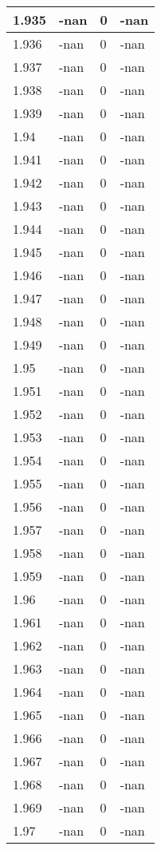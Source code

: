 \documentclass[a4paper,14pt]{extarticle}
\begin{document}
\begin{longtable}{||m{3cm}||m{3cm}|m{3cm}||m{3cm}||}
\hline
1.935 & -nan & 0 & -nan\\
\hline
1.936 & -nan & 0 & -nan\\
\hline
1.937 & -nan & 0 & -nan\\
\hline
1.938 & -nan & 0 & -nan\\
\hline
1.939 & -nan & 0 & -nan\\
\hline
1.94 & -nan & 0 & -nan\\
\hline
1.941 & -nan & 0 & -nan\\
\hline
1.942 & -nan & 0 & -nan\\
\hline
1.943 & -nan & 0 & -nan\\
\hline
1.944 & -nan & 0 & -nan\\
\hline
1.945 & -nan & 0 & -nan\\
\hline
1.946 & -nan & 0 & -nan\\
\hline
1.947 & -nan & 0 & -nan\\
\hline
1.948 & -nan & 0 & -nan\\
\hline
1.949 & -nan & 0 & -nan\\
\hline
1.95 & -nan & 0 & -nan\\
\hline
1.951 & -nan & 0 & -nan\\
\hline
1.952 & -nan & 0 & -nan\\
\hline
1.953 & -nan & 0 & -nan\\
\hline
1.954 & -nan & 0 & -nan\\
\hline
1.955 & -nan & 0 & -nan\\
\hline
1.956 & -nan & 0 & -nan\\
\hline
1.957 & -nan & 0 & -nan\\
\hline
1.958 & -nan & 0 & -nan\\
\hline
1.959 & -nan & 0 & -nan\\
\hline
1.96 & -nan & 0 & -nan\\
\hline
1.961 & -nan & 0 & -nan\\
\hline
1.962 & -nan & 0 & -nan\\
\hline
1.963 & -nan & 0 & -nan\\
\hline
1.964 & -nan & 0 & -nan\\
\hline
1.965 & -nan & 0 & -nan\\
\hline
1.966 & -nan & 0 & -nan\\
\hline
1.967 & -nan & 0 & -nan\\
\hline
1.968 & -nan & 0 & -nan\\
\hline
1.969 & -nan & 0 & -nan\\
\hline
1.97 & -nan & 0 & -nan\\

\end{longtable}
\end{document}
